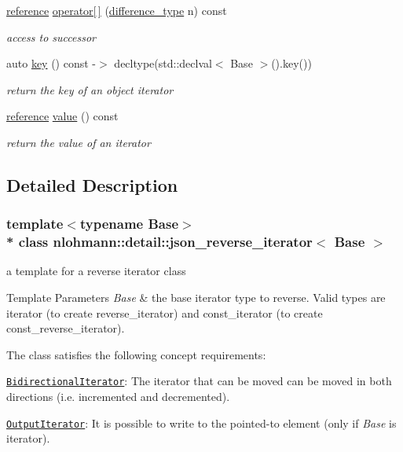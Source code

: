 \begin{DoxyCompactItemize}
\hyperlink{classnlohmann_1_1detail_1_1json__reverse__iterator_a42f51a69bac7b2aebb613b2164e457f1}{reference} \hyperlink{classnlohmann_1_1detail_1_1json__reverse__iterator_ad01fd54e148e36d9e24cf9ad0fe31d00}{operator\mbox{[}$\,$\mbox{]}} (\hyperlink{classnlohmann_1_1detail_1_1json__reverse__iterator_a9ab55987c05ec6427ad36082e351cc45}{difference\+\_\+type} n) const 
\begin{DoxyCompactList}\small\item\em access to successor \end{DoxyCompactList}\item 
auto \hyperlink{classnlohmann_1_1detail_1_1json__reverse__iterator_adc648a641e8e9a1072c5abd56ad06401}{key} () const -\/$>$ decltype(std\+::declval$<$ Base $>$().key())
\begin{DoxyCompactList}\small\item\em return the key of an object iterator \end{DoxyCompactList}\item 
\hyperlink{classnlohmann_1_1detail_1_1json__reverse__iterator_a42f51a69bac7b2aebb613b2164e457f1}{reference} \hyperlink{classnlohmann_1_1detail_1_1json__reverse__iterator_a4c4e94317f95315f95e9909cf8d65dbf}{value} () const 
\begin{DoxyCompactList}\small\item\em return the value of an iterator \end{DoxyCompactList}\end{DoxyCompactItemize}


\subsection{Detailed Description}
\subsubsection*{template$<$typename Base$>$\\*
class nlohmann\+::detail\+::json\+\_\+reverse\+\_\+iterator$<$ Base $>$}

a template for a reverse iterator class 


\begin{DoxyTemplParams}{Template Parameters}
{\em Base} & the base iterator type to reverse. Valid types are iterator (to create reverse\+\_\+iterator) and const\+\_\+iterator (to create const\+\_\+reverse\+\_\+iterator).\\
\hline
\end{DoxyTemplParams}
The class satisfies the following concept requirements\+:
\begin{DoxyItemize}
\item \href{https://en.cppreference.com/w/cpp/named_req/BidirectionalIterator}{\tt Bidirectional\+Iterator}\+: The iterator that can be moved can be moved in both directions (i.\+e. incremented and decremented).
\item \href{https://en.cppreference.com/w/cpp/named_req/OutputIterator}{\tt Output\+Iterator}\+: It is possible to write to the pointed-\/to element (only if {\itshape Base} is iterator).
\end{DoxyItemize}

